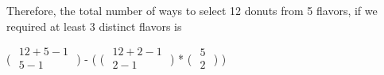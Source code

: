 \documentclass{6042}
\begin{document}
Therefore, the total number of ways to select 12 donuts from 5 flavors, if we required
at least 3 distinct flavors is 


(
\(
  {\begin{array}{c}
   12+5-1\\
   5-1\\
  \end{array} }
\)
)
-
(  
(
   \(
     {\begin{array}{c}
      12+2-1\\
      2-1\\
     \end{array} }
   \)
   )
   *
   (
   \(
     {\begin{array}{c}
      5\\
      2\\
     \end{array} }
   \)
   )
)
\end{document}
